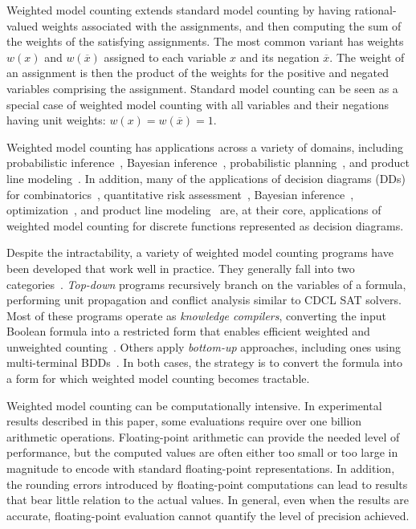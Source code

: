 \documentclass[
hf
]{ceurart}
\newcommand{\obar}[1]{\overline{#1}}
\begin{document}
Weighted model counting extends standard model counting by having
rational-valued weights associated with the assignments, and then
computing the sum of the weights of the satisfying assignments.  The
most common variant has weights $w(x)$ and $w(\obar{x})$
assigned to each variable $x$ and its negation $\obar{x}$.  The
weight of an assignment is then the product of the weights for
the positive and negated variables comprising the assignment.
Standard model counting can be seen as a special case of weighted model
counting with all variables and their negations having unit weights: $w(x) = w(\obar{x}) = 1$.

Weighted model counting has applications across a variety of domains,
including probabilistic inference~\cite{chavira:ai:2008,dubray:cp:2024}, Bayesian
inference~\cite{sang:aaai:2005}, probabilistic
planning~\cite{domshlak:jair:2007}, and product line modeling~\cite{sundermann:eme:2023,sundermann:tsem:2024}.  In addition, many of the
applications of decision diagrams (DDs) for
combinatorics~\cite{knuth:bdd:2011}, quantitative risk
assessment~\cite{andrews:ieeetr:2000,groen:ress:2006,hardy:ieeer:2007,xing:wiley:2015,xing:amm:2025},
Bayesian inference~\cite{minato:ijcai:2007},
optimization~\cite{bergman:book:2016}, and
product line modeling~\cite{andersen:jair:2010,benavides:is:2010} are, at their core, applications of
weighted model counting for discrete functions represented as decision diagrams.

Despite the intractability, a variety of weighted model counting
programs have been developed that work well in practice.  They
generally fall into two categories~\cite{shaw:kr:2024}. \emph{Top-down} programs
recursively branch on the variables of a formula, performing unit
propagation and conflict analysis similar to CDCL SAT solvers.  Most
of these programs operate as \emph{knowledge compilers}, converting
the input Boolean formula into a restricted form that enables efficient
weighted and unweighted counting~\cite{darwiche:aaai:2002,darwiche:ecai:2004,lagniez:ijcai:2017,muise:cai:2012,oztok:cp:2014,sharma:ijcai:2019}.
Others apply \emph{bottom-up} approaches, including ones using
multi-terminal BDDs~\cite{dudek:aaai:2020,dudek:sat:2021}.  In both
cases, the strategy is to convert the formula into a form for which
weighted model counting becomes tractable.

Weighted model counting can be computationally intensive.  In
experimental results described in this paper, some evaluations 
require over one billion arithmetic operations.
Floating-point arithmetic can provide the needed level of performance,
but the computed values are often either too small or too
large in magnitude to encode with standard floating-point
representations.  In addition, the rounding errors
introduced by floating-point computations can lead to results
that bear little relation to the actual values.  In general, even when the results are accurate,
floating-point evaluation cannot quantify the level of precision achieved.
\end{document}
